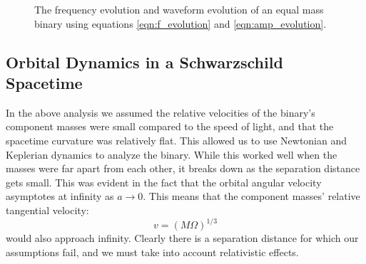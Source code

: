 \begin{figure}[htbp]
\center
{}
\caption{The frequency evolution and waveform evolution of an equal mass binary using equations \ref{eqn:f_evolution} and \ref{eqn:amp_evolution}.}
\label{fig:GW_evolution}
\end{figure}


\subsection{Orbital Dynamics in a Schwarzschild Spacetime}
\label{sec:schwarzschild_dynamics}

In the above analysis we assumed the relative velocities of the binary's component masses were small compared to the speed of light, and that the spacetime curvature was relatively flat. This allowed us to use Newtonian and Keplerian dynamics to analyze the binary. While this worked well when the masses were far apart from each other, it breaks down as the separation distance gets small. This was evident in the fact that the orbital angular velocity asymptotes at infinity as $a \rightarrow 0$. This means that the component masses' relative tangential velocity:
\begin{equation}
v = (M\Omega)^{1/3}
\end{equation}
would also approach infinity. Clearly there is a separation distance for which our assumptions fail, and we must take into account relativistic effects.

